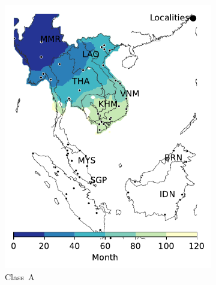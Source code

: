 \documentclass[10pt]{article}
\theoremstyle{definition}
\begin{document}
\begin{figure}[ht]
    \centering
\begin{subfigure}[b]{.47\textwidth}
    \includegraphics[width=\textwidth]{../cellular_automata/results/contour/MSA_model-A_m2_l1.pdf}
    \caption{Class~A\label{fig:msaClassA}}
\end{subfigure}\hspace{.5cm}
\begin{subfigure}[b]{.47\textwidth}

\end{subfigure}
\end{figure}
\end{document}
